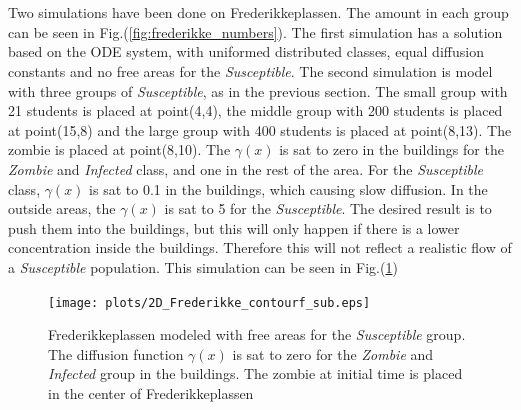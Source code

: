 \documentclass[%
twoside,                 %
final,                   %
10pt]{article}
\begin{document}
\\
\\
Two simulations have been done on Frederikkeplassen. The amount in each group can be seen in Fig.(\ref{fig:frederikke_numbers}). The first simulation has a solution based on the ODE system, with uniformed distributed classes, equal diffusion constants and no free areas for the \emph{Susceptible}. The second simulation is model with three groups of \emph{Susceptible}, as in the previous section. The small group with 21 students is placed at point(4,4), the middle group with 200 students is placed at point(15,8) and the large group with 400 students is placed at point(8,13). The zombie is placed at point(8,10). The $\gamma(x)$ is sat to zero in the buildings for the \emph{Zombie} and \emph{Infected} class, and one in the rest of the area. For the \emph{Susceptible} class, $\gamma(x)$ is sat to 0.1 in the buildings, which causing slow diffusion. In the outside areas, the $\gamma(x)$ is sat to 5 for the \emph{Susceptible}. The desired result is to push them into the buildings, but this will only happen if there is a lower concentration inside the buildings. Therefore this will not reflect a realistic flow of a \emph{Susceptible} population. This simulation can be seen in Fig.(\ref{fig:frederikke_free_area})  


\begin{figure}[ht]
  \centerline{\texttt{[image: plots/2D\_Frederikke\_contourf\_sub.eps]}}
  \caption{
  \label{fig:frederikke_free_area} Frederikkeplassen modeled with free areas for the \emph{Susceptible} group. The diffusion function $\gamma(x)$ is sat to zero for the \emph{Zombie} and \emph{Infected} group in the buildings. The zombie at initial time is placed in the center of Frederikkeplassen
  }
\end{figure}
\end{document}
